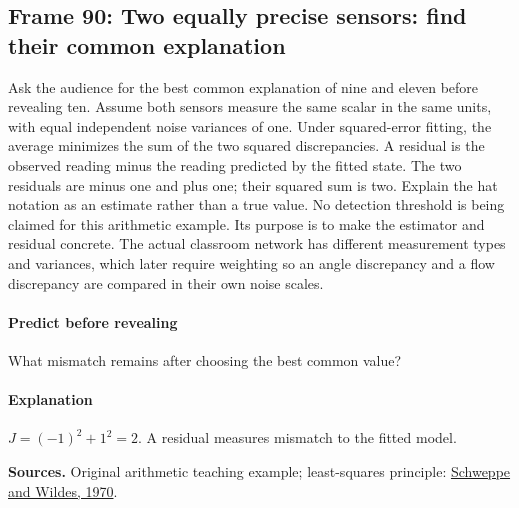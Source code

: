 \documentclass[11pt]{article}
\begin{document}
\subsection*{Frame 90: Two equally precise sensors: find their common explanation}
Ask the audience for the best common explanation of nine and eleven before revealing ten. Assume both sensors measure the same scalar in the same units, with equal independent noise variances of one. Under squared-error fitting, the average minimizes the sum of the two squared discrepancies. A residual is the observed reading minus the reading predicted by the fitted state. The two residuals are minus one and plus one; their squared sum is two. Explain the hat notation as an estimate rather than a true value. No detection threshold is being claimed for this arithmetic example. Its purpose is to make the estimator and residual concrete. The actual classroom network has different measurement types and variances, which later require weighting so an angle discrepancy and a flow discrepancy are compared in their own noise scales.\par
\paragraph{Predict before revealing}What mismatch remains after choosing the best common value?
\paragraph{Explanation}$J=(-1)^2+1^2=2$. A residual measures mismatch to the fitted model.
\par\nopagebreak\begin{minipage}{\linewidth}{\footnotesize\color{slate}\textbf{Sources.} Original arithmetic teaching example; least-squares principle: \href{https://doi.org/10.1109/TPAS.1970.292678}{Schweppe and Wildes, 1970}.\par}\end{minipage}\par\medskip
\end{document}
